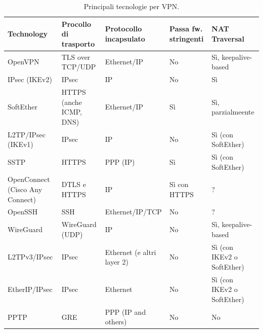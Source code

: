 \begin{table}
	\begin{tabular}{|p{3.3cm}|p{2.7cm}|p{3.1cm}|p{1.7cm}|p{3cm}|}
		\hline
		Technology                      & Procollo di trasporto   & Protocollo incapsulato     & Passa fw. stringenti & NAT Traversal               \\
		\hline
		OpenVPN                         & TLS over TCP/UDP        & Ethernet/IP                & No                   & Sì, keepalive-based        \\
		\hline
		IPsec (IKEv2)                   & IPsec                   & IP                         & No                   & Sì                         \\
		\hline
		SoftEther                       & HTTPS (anche ICMP, DNS) & Ethernet/IP                & Sì                  & Sì, parzialmeente          \\
		\hline
		L2TP/IPsec (IKEv1)              & IPsec                   & IP                         & No                   & Sì (con SoftEther)         \\
		\hline
		\hline
		SSTP                            & HTTPS                   & PPP (IP)                   & Sì                  & Sì (con SoftEther)         \\
		\hline
		OpenConnect (Cisco Any Connect) & DTLS e HTTPS            & IP                         & Sì con HTTPS        & ?                           \\
		\hline
		OpenSSH                         & SSH                     & Ethernet/IP/TCP            & No                   & ?                           \\
		\hline
		WireGuard                       & WireGuard (UDP)         & IP                         & No                   & Sì, keepalive-based        \\
		\hline
		L2TPv3/IPsec                    & IPsec                   & Ethernet (e altri layer 2) & No                   & Sì (con IKEv2 o SoftEther) \\
		\hline
		EtherIP/IPsec                   & IPsec                   & Ethernet                   & No                   & Sì (con IKEv2 o SoftEther) \\
		\hline
		PPTP                            & GRE                     & PPP (IP and others)        & No                   & No                          \\
		\hline
	\end{tabular}
  \caption[Tecnolgie per VPN. Con ``Protocollo di trasporto'' si intende
  quale è il protocollo di più alto livello in cui si incapsulano i pacchetti indicati
  dalla colonna ``Protocollo incapsulato''. Per ``fw stringenti'' si intendono firewall
  in grado di fare filtraggio al livello applicativo.]{Principali tecnologie per VPN.}
  \label{tbl:vpn-comparison}
\end{table}

